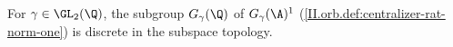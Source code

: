 For $\gamma\in\GL_2(\Q)$, the subgroup $G_\gamma(\Q)$ of $G_\gamma(\A)^1$ (\cref{II.orb.def:centralizer-rat-norm-one}) is discrete in the
subspace topology.
